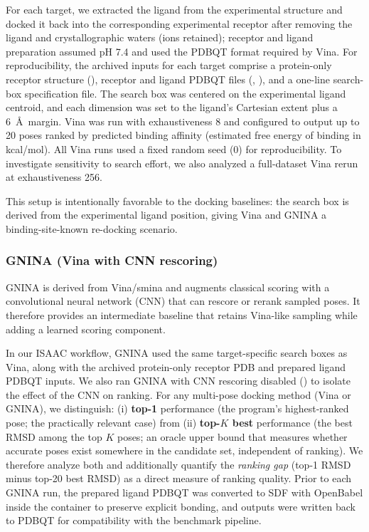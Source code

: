 \documentclass[journal=jcisd8,manuscript=article]{achemso}
\begin{document}
For each target, we extracted the ligand from the experimental structure and docked it back into the corresponding experimental receptor after removing the ligand and crystallographic waters (ions retained); receptor and ligand preparation assumed pH 7.4 and used the PDBQT format required by Vina.
For reproducibility, the archived inputs for each target comprise a protein-only receptor structure (), receptor and ligand PDBQT files (, ), and a one-line search-box specification file.
The search box was centered on the experimental ligand centroid, and each dimension was set to the ligand's Cartesian extent plus a 6~\AA\ margin.
Vina was run with exhaustiveness 8 and configured to output up to 20 poses ranked by predicted binding affinity (estimated free energy of binding in kcal/mol).
All Vina runs used a fixed random seed (0) for reproducibility.
To investigate sensitivity to search effort, we also analyzed a full-dataset Vina rerun at exhaustiveness 256.

This setup is intentionally favorable to the docking baselines: the search box is derived from the experimental ligand position, giving Vina and GNINA a binding-site-known re-docking scenario.

\subsubsection{GNINA (Vina with CNN rescoring)}

GNINA is derived from Vina/smina and augments classical scoring with a convolutional neural network (CNN) that can rescore or rerank sampled poses.\cite{mcnutt2025gnina13}
It therefore provides an intermediate baseline that retains Vina-like sampling while adding a learned scoring component.

In our ISAAC workflow, GNINA used the same target-specific search boxes as Vina, along with the archived protein-only receptor PDB and prepared ligand PDBQT inputs.
We also ran GNINA with CNN rescoring disabled () to isolate the effect of the CNN on ranking.
For any multi-pose docking method (Vina or GNINA), we distinguish:
(i) \textbf{top-1} performance (the program's highest-ranked pose; the practically relevant case) from
(ii) \textbf{top-$K$ best} performance (the best RMSD among the top $K$ poses; an oracle upper bound that measures whether accurate poses exist somewhere in the candidate set, independent of ranking).
We therefore analyze both and additionally quantify the \emph{ranking gap} (top-1 RMSD minus top-20 best RMSD) as a direct measure of ranking quality.
Prior to each GNINA run, the prepared ligand PDBQT was converted to SDF with OpenBabel inside the container to preserve explicit bonding, and outputs were written back to PDBQT for compatibility with the benchmark pipeline.
\end{document}
